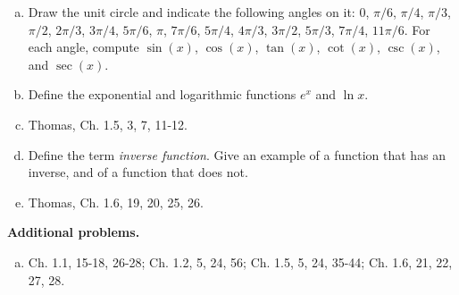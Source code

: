 \documentclass[12pt]{article}
\begin{document}
\begin{enumerate}[(a)]
\item
Draw the unit circle and indicate the following angles on it: $0$, $\pi/6$, $\pi/4$, $\pi/3$,
$\pi/2$, $2\pi/3$, $3\pi/4$, $5 \pi/6$, $\pi$, $7\pi/6$, $5 \pi/4$, $4 \pi /3$, $3 \pi /2$,
$5 \pi/3$, $7 \pi /4$, $11 \pi /6$. For each angle, compute $\sin(x)$, $\cos(x)$, $\tan(x)$,
$\cot(x)$, $\csc(x)$, and $\sec(x)$.

\item
Define the exponential and logarithmic functions $e^x$ and $\ln x$. 

\item
Thomas, Ch. 1.5, 3, 7, 11-12.

\item
Define the term {\itshape inverse function}. Give an example of a function that has an inverse,
and of a function that does not.

\item
Thomas, Ch. 1.6, 19, 20, 25, 26.

\end{enumerate}
{\bf Additional problems.}
\begin{enumerate}[(a)]

\item
Ch. 1.1, 15-18, 26-28; Ch. 1.2, 5, 24, 56;
Ch. 1.5, 5, 24, 35-44; 
Ch. 1.6, 21, 22, 27, 28.

\end{enumerate}
\end{document}
